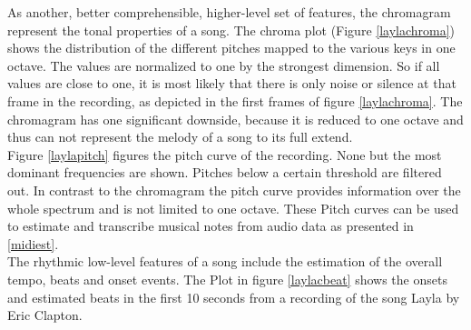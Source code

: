 As another, better comprehensible, higher-level set of features, the chromagram represent the tonal properties of a song. The chroma plot (Figure \ref{laylachroma}) shows the distribution of the different pitches mapped to the various keys in one octave. The values are normalized to one by the strongest dimension. So if all values are close to one, it is most likely that there is only noise or silence at that frame in the recording, as depicted in the first frames of figure \ref{laylachroma}. The chromagram has one significant downside, because it is reduced to one octave and thus can not represent the melody of a song to its full extend.\\
Figure \ref{laylapitch} figures the pitch curve of the recording. None but the most dominant frequencies are shown. Pitches below a certain threshold are filtered out. In contrast to the chromagram the pitch curve provides information over the whole spectrum and is not limited to one octave. These Pitch curves can be used to estimate and transcribe musical notes from audio data as presented in \ref{midiest}.\\
The rhythmic low-level features of a song include the estimation of the overall tempo, beats and onset events. 
The Plot in figure \ref{laylacbeat} shows the onsets and estimated beats in the first 10 seconds from a recording of the song Layla by Eric Clapton.
